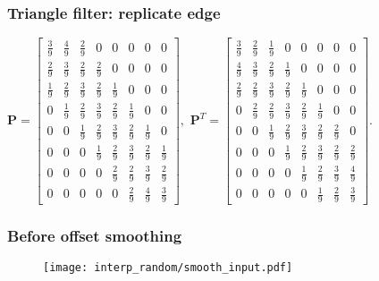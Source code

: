 \begin{frame}
\frametitle{Triangle filter: replicate edge}

$\mathbf{P} = \begin{bmatrix} \frac{3}{9} & \frac{4}{9} & \frac{2}{9} & 0 & 0 & 0 & 0 & 0 \\
					        \frac{2}{9} & \frac{3}{9} & \frac{2}{9} & \frac{2}{9} & 0 & 0 & 0 & 0 \\
					        \frac{1}{9} & \frac{2}{9} & \frac{3}{9} & \frac{2}{9} & \frac{1}{9} & 0 & 0 & 0 \\
					        0 & \frac{1}{9}& \frac{2}{9}& \frac{3}{9}& \frac{2}{9}& \frac{1}{9}& 0 & 0 \\
					        0 & 0 & \frac{1}{9}& \frac{2}{9}& \frac{3}{9}& \frac{2}{9}& \frac{1}{9}& 0 \\
					        0 & 0 & 0 & \frac{1}{9}& \frac{2}{9}& \frac{3}{9}& \frac{2}{9}& \frac{1}{9}\\
					        0 & 0 & 0 & 0 & \frac{2}{9}& \frac{2}{9}& \frac{3}{9}& \frac{2}{9}\\
					        0 & 0 & 0 & 0 & 0 & \frac{2}{9}& \frac{4}{9}& \frac{3}{9}\end{bmatrix},$ $\mathbf{P}^T = \begin{bmatrix}\frac{3}{9}& \frac{2}{9}& \frac{1}{9}& 0 & 0 & 0 & 0 & 0 \\
					               \frac{4}{9}& \frac{3}{9}& \frac{2}{9}& \frac{1}{9}& 0 & 0 & 0 & 0 \\
					               \frac{2}{9}& \frac{2}{9}& \frac{3}{9}& \frac{2}{9}& \frac{1}{9}& 0 & 0 & 0 \\
					               0 & \frac{2}{9}& \frac{2}{9}& \frac{3}{9}& \frac{2}{9}& \frac{1}{9}& 0 & 0 \\
					               0 & 0 & \frac{1}{9}& \frac{2}{9}& \frac{3}{9}& \frac{2}{9}& \frac{2}{9}& 0 \\
					               0 & 0 & 0 & \frac{1}{9}& \frac{2}{9}& \frac{3}{9}& \frac{2}{9}& \frac{2}{9}\\
					               0 & 0 & 0 & 0 & \frac{1}{9}& \frac{2}{9}& \frac{3}{9}& \frac{4}{9}\\
					               0 & 0 & 0 & 0 & 0 & \frac{1}{9}& \frac{2}{9}& \frac{3}{9}\end{bmatrix}$.
					     
\end{frame}

\begin{frame}
\frametitle{Before offset smoothing}
\begin{figure} 
\texttt{[image: interp\_random/smooth\_input.pdf]} \\
\end{figure} 
\end{frame}

